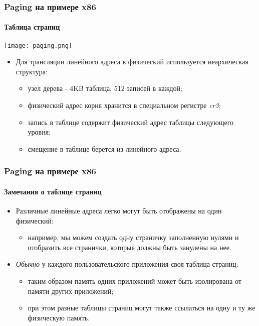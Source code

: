 \begin{frame}
\frametitle{Paging на примере x86}
\framesubtitle{Таблица страниц}
\begin{center}
  \texttt{[image: paging.png]}
\end{center}
\begin{itemize}
  \item Для трансляции линейного адреса в физический используется иеархическая
  структура:
  \begin{itemize}
    \item узел дерева - 4KB таблица, 512 записей в каждой;
    \item физический адрес корня хранится в специальном регистре \emph{cr3};
    \item запись в таблице содержит физический адрес таблицы следующего уровня;
    \item смещение в таблице берется из линейного адреса.
  \end{itemize}
\end{itemize}
\end{frame}

\begin{frame}
\frametitle{Paging на примере x86}
\framesubtitle{Замечания о таблице страниц}
\begin{itemize}
  \item Различные линейные адреса легко могут быть отображены на один
  физический:
  \begin{itemize}
     \item например, мы можем создать одну страничку заполненную нулями и
     отобразить все странички, которые должны быть занулены на нее.
  \end{itemize}
  \item \emph{Обычно} у каждого пользовательского приложения своя таблица
  страниц:
  \begin{itemize}
    \item таким образом память одних приложений может быть изолирована от памяти
    других приложений;
    \item при этом разные таблицы страниц могут также ссылаться на одну и ту же
    физическую память.
  \end{itemize}
\end{itemize}
\end{frame}

